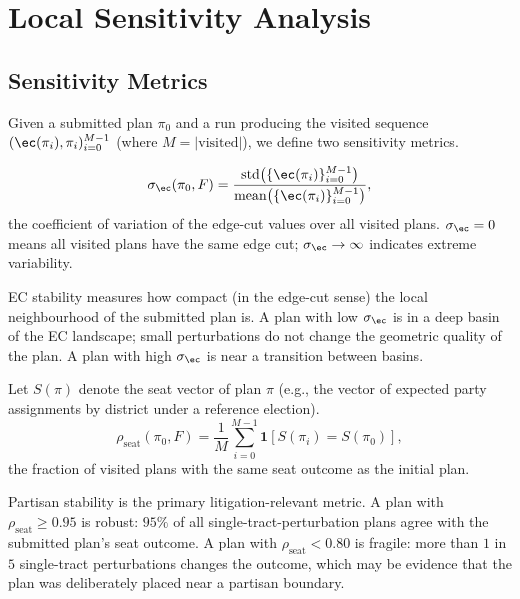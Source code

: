 \section{Local Sensitivity Analysis}
\label{sec:sensitivity}

\subsection{Sensitivity Metrics}

Given a submitted plan $\pi_0$ and a \flip{} run producing the visited
sequence $(\ec(\pi_i), \pi_i)_{i=0}^{M-1}$ (where $M = |\mathrm{visited}|$),
we define two sensitivity metrics.

\begin{definition}[EC stability]
\label{def:ec-stability}
\[
  \sigma_{\ec}(\pi_0, F) = \frac{\mathrm{std}\bigl(\{\ec(\pi_i)\}_{i=0}^{M-1}\bigr)}
                                  {\mathrm{mean}\bigl(\{\ec(\pi_i)\}_{i=0}^{M-1}\bigr)},
\]
the coefficient of variation of the edge-cut values over all visited plans.
$\sigma_{\ec} = 0$ means all visited plans have the same edge cut;
$\sigma_{\ec} \to \infty$ indicates extreme variability.
\end{definition}

EC stability measures how compact (in the edge-cut sense) the local
neighbourhood of the submitted plan is.
A plan with low $\sigma_{\ec}$ is in a deep basin of the EC landscape;
small perturbations do not change the geometric quality of the plan.
A plan with high $\sigma_{\ec}$ is near a transition between basins.

\begin{definition}
\label{def:partisan-stability}
Let $S(\pi)$ denote the seat vector of plan $\pi$ (e.g., the vector of
expected party assignments by district under a reference election).
\[
  \rho_{\mathrm{seat}}(\pi_0, F) = \frac{1}{M}
    \sum_{i=0}^{M-1} \mathbf{1}[S(\pi_i) = S(\pi_0)],
\]
the fraction of visited plans with the same seat outcome as the initial plan.
\end{definition}

Partisan stability is the primary litigation-relevant metric.
A plan with $\rho_{\mathrm{seat}} \geq 0.95$ is robust: $95\%$ of all
single-tract-perturbation plans agree with the submitted plan's seat outcome.
A plan with $\rho_{\mathrm{seat}} < 0.80$ is fragile: more than $1$ in $5$
single-tract perturbations changes the outcome, which may be evidence that
the plan was deliberately placed near a partisan boundary.

